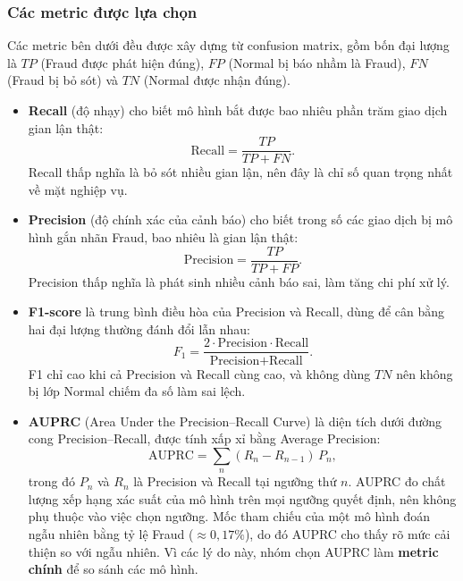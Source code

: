 \subsubsection{Các metric được lựa chọn}
Các metric bên dưới đều được xây dựng từ confusion matrix, gồm bốn đại lượng là $TP$ (Fraud được phát hiện đúng), $FP$ (Normal bị báo nhầm là Fraud), $FN$ (Fraud bị bỏ sót) và $TN$ (Normal được nhận đúng).
\begin{itemize}
    \item \textbf{Recall} (độ nhạy) cho biết mô hình bắt được bao nhiêu phần trăm giao dịch gian lận thật:
    \begin{equation}
        \text{Recall} = \frac{TP}{TP + FN}.
    \end{equation}
    Recall thấp nghĩa là bỏ sót nhiều gian lận, nên đây là chỉ số quan trọng nhất về mặt nghiệp vụ.

    \item \textbf{Precision} (độ chính xác của cảnh báo) cho biết trong số các giao dịch bị mô hình gắn nhãn Fraud, bao nhiêu là gian lận thật:
    \begin{equation}
        \text{Precision} = \frac{TP}{TP + FP}.
    \end{equation}
    Precision thấp nghĩa là phát sinh nhiều cảnh báo sai, làm tăng chi phí xử lý.

    \item \textbf{F1-score} là trung bình điều hòa của Precision và Recall, dùng để cân bằng hai đại lượng thường đánh đổi lẫn nhau:
    \begin{equation}
        F_1 = \frac{2 \cdot \text{Precision} \cdot \text{Recall}}{\text{Precision} + \text{Recall}}.
    \end{equation}
    F1 chỉ cao khi cả Precision và Recall cùng cao, và không dùng $TN$ nên không bị lớp Normal chiếm đa số làm sai lệch.

    \item \textbf{AUPRC} (Area Under the Precision--Recall Curve) là diện tích dưới đường cong Precision--Recall, được tính xấp xỉ bằng Average Precision:
    \begin{equation}
        \text{AUPRC} = \sum_{n} (R_n - R_{n-1}) \, P_n,
    \end{equation}
    trong đó $P_n$ và $R_n$ là Precision và Recall tại ngưỡng thứ $n$. AUPRC đo chất lượng xếp hạng xác suất của mô hình trên mọi ngưỡng quyết định, nên không phụ thuộc vào việc chọn ngưỡng. Mốc tham chiếu của một mô hình đoán ngẫu nhiên bằng tỷ lệ Fraud ($\approx 0{,}17\%$), do đó AUPRC cho thấy rõ mức cải thiện so với ngẫu nhiên. Vì các lý do này, nhóm chọn AUPRC làm \textbf{metric chính} để so sánh các mô hình.
\end{itemize}

